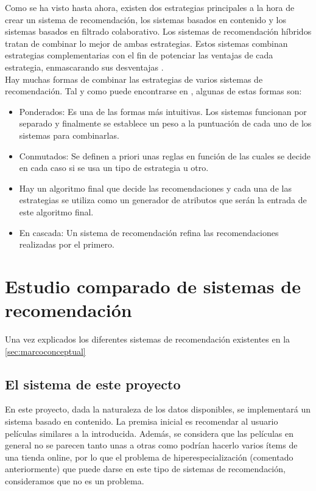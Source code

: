 Como se ha visto hasta ahora, existen dos estrategias principales a la hora de crear un sistema de recomendación, los sistemas basados en contenido y los sistemas basados en filtrado colaborativo. Los sistemas de recomendación híbridos tratan de combinar lo mejor de ambas estrategias. Estos sistemas combinan estrategias complementarias con el fin de potenciar las ventajas de cada estrategia, enmascarando sus desventajas \cite{CanoMorisio2017}.\\

Hay muchas formas de combinar las estrategias de varios sistemas de recomendación. Tal y como puede encontrarse en \cite{Burke2002}, algunas de estas formas son:

\begin{itemize}
    \item Ponderados: Es una de las formas más intuitivas. Los sistemas funcionan por separado y finalmente se establece un peso a la puntuación de cada uno de los sistemas para combinarlas.
    \item Conmutados: Se definen a priori unas reglas en función de las cuales se decide en cada caso si se usa un tipo de estrategia u otro.
    \item Hay un algoritmo final que decide las recomendaciones y cada una de las estrategias se utiliza como un generador de atributos que serán la entrada de este algoritmo final.
    \item En cascada: Un sistema de recomendación refina las recomendaciones realizadas por el primero.
\end{itemize}

\section{Estudio comparado de sistemas de recomendación}

Una vez explicados los diferentes sistemas de recomendación existentes en la \autoref{sec:marcoconceptual}

\subsection{El sistema de este proyecto}

En este proyecto, dada la naturaleza de los datos disponibles, se implementará un sistema basado en contenido. La premisa inicial es recomendar al usuario películas similares a la introducida. Además, se considera que las películas en general no se parecen tanto unas a otras como podrían hacerlo varios ítems de una tienda online, por lo que el problema de hiperespecialización (comentado anteriormente) que puede darse en este tipo de sistemas de recomendación, consideramos que no es un problema.\\

